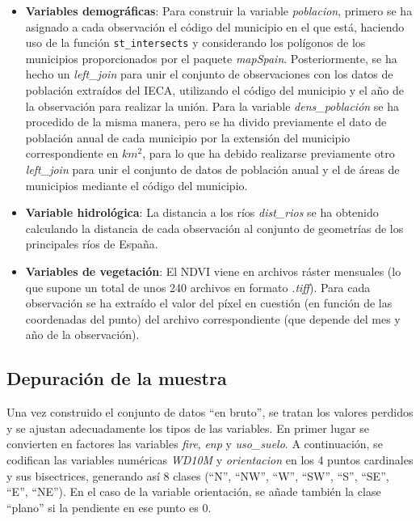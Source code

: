 \documentclass[12pt,a4paper,]{book}
\numberwithin{dummy}{section}
\theoremstyle{ocrenumbox}
\theoremstyle{blacknumex}
\theoremstyle{blacknumbox}
\theoremstyle{ocrenum}
\theoremstyle{ocrenum}
\begin{document}
\begin{itemize}
\item
  \textbf{Variables demográficas}: Para construir la variable
  \emph{poblacion}, primero se ha asignado a cada observación el código
  del municipio en el que está, haciendo uso de la función
  \texttt{st\_intersects} y considerando los polígonos de los municipios
  proporcionados por el paquete \emph{mapSpain}. Posteriormente, se ha
  hecho un \emph{left\_join} para unir el conjunto de observaciones con
  los datos de población extraídos del IECA, utilizando el código del
  municipio y el año de la observación para realizar la unión. Para la
  variable \emph{dens\_población} se ha procedido de la misma manera,
  pero se ha divido previamente el dato de población anual de cada
  municipio por la extensión del municipio correspondiente en \(km^2\),
  para lo que ha debido realizarse previamente otro \emph{left\_join}
  para unir el conjunto de datos de población anual y el de áreas de
  municipios mediante el código del municipio.
\item
  \textbf{Variable hidrológica}: La distancia a los ríos
  \emph{dist\_rios} se ha obtenido calculando la distancia de cada
  observación al conjunto de geometrías de los principales ríos de
  España.
\item
  \textbf{Variables de vegetación}: El NDVI viene en archivos ráster
  mensuales (lo que supone un total de unos 240 archivos en formato
  \emph{.tiff}). Para cada observación se ha extraído el valor del píxel
  en cuestión (en función de las coordenadas del punto) del archivo
  correspondiente (que depende del mes y año de la observación).
\end{itemize}

\hypertarget{depuraciuxf3n-de-la-muestra}{%
\subsection{Depuración de la
muestra}\label{depuraciuxf3n-de-la-muestra}}

Una vez construido el conjunto de datos ``en bruto'', se tratan los
valores perdidos y se ajustan adecuadamente los tipos de las variables.
En primer lugar se convierten en factores las variables \emph{fire},
\emph{enp} y \emph{uso\_suelo}. A continuación, se codifican las
variables numéricas \emph{WD10M} y \emph{orientacion} en los 4 puntos
cardinales y sus bisectrices, generando así 8 clases (``N'', ``NW'',
``W'', ``SW'', ``S'', ``SE'', ``E'', ``NE''). En el caso de la variable
orientación, se añade también la clase ``plano'' si la pendiente en ese
punto es 0.
\end{document}
